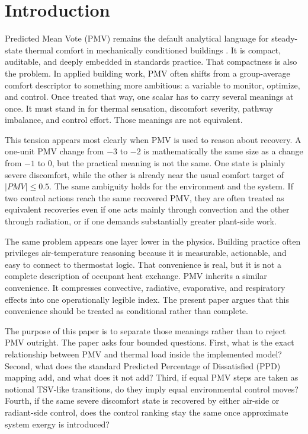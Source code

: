 \documentclass[preprint,authoryear,12pt]{elsarticle}
\begin{document}
\section{Introduction}

Predicted Mean Vote (PMV) remains the default analytical language for steady-state thermal comfort in mechanically conditioned buildings \citep{Fanger1970,ISO7730_2025,ASHRAE55_2023}. It is compact, auditable, and deeply embedded in standards practice. That compactness is also the problem. In applied building work, PMV often shifts from a group-average comfort descriptor to something more ambitious: a variable to monitor, optimize, and control. Once treated that way, one scalar has to carry several meanings at once. It must stand in for thermal sensation, discomfort severity, pathway imbalance, and control effort. Those meanings are not equivalent.

This tension appears most clearly when PMV is used to reason about recovery. A one-unit PMV change from $-3$ to $-2$ is mathematically the same size as a change from $-1$ to $0$, but the practical meaning is not the same. One state is plainly severe discomfort, while the other is already near the usual comfort target of $|PMV| \le 0.5$. The same ambiguity holds for the environment and the system. If two control actions reach the same recovered PMV, they are often treated as equivalent recoveries even if one acts mainly through convection and the other through radiation, or if one demands substantially greater plant-side work.

The same problem appears one layer lower in the physics. Building practice often privileges air-temperature reasoning because it is measurable, actionable, and easy to connect to thermostat logic. That convenience is real, but it is not a complete description of occupant heat exchange. PMV inherits a similar convenience. It compresses convective, radiative, evaporative, and respiratory effects into one operationally legible index. The present paper argues that this convenience should be treated as conditional rather than complete.

The purpose of this paper is to separate those meanings rather than to reject PMV outright. The paper asks four bounded questions. First, what is the exact relationship between PMV and thermal load inside the implemented model? Second, what does the standard Predicted Percentage of Dissatisfied (PPD) mapping add, and what does it not add? Third, if equal PMV steps are taken as notional TSV-like transitions, do they imply equal environmental control moves? Fourth, if the same severe discomfort state is recovered by either air-side or radiant-side control, does the control ranking stay the same once approximate system exergy is introduced?
\end{document}
